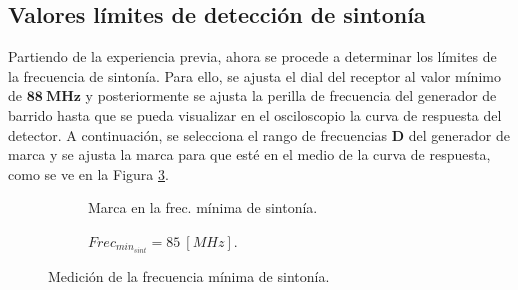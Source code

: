   \subsection{Valores límites de detección de sintonía}

    Partiendo de la experiencia previa, ahora se procede a determinar los límites de la frecuencia 
    de sintonía. Para ello, se ajusta el dial del receptor al valor mínimo de 
    \(\mathbf{88~MHz}\) y posteriormente se ajusta la perilla de frecuencia del generador 
    de barrido hasta que se pueda visualizar en el osciloscopio la curva de respuesta 
    del detector. A continuación, se selecciona el rango de frecuencias \textbf{D} 
    del generador de marca y se ajusta la marca para que esté en el medio de la 
    curva de respuesta, como se ve en la Figura \ref{fig:FrecMintSint}.   
      \begin{figure}[H]
        \centering
        \begin{subfigure}[ht]{0.48\textwidth}
          \caption{Marca en la frec. mínima de sintonía.}
          \label{fig:FrecMinSintConGen}
        \end{subfigure}
        \hfill 
        \begin{subfigure}[ht]{0.48\textwidth}
          \caption{\(Frec_{min_{sint}} = 85~[MHz]\).}
          \label{fig:FrecMinSintValor}
        \end{subfigure}
        \caption{Medición de la frecuencia mínima de sintonía.}
        \label{fig:FrecMintSint}
      \end{figure}

